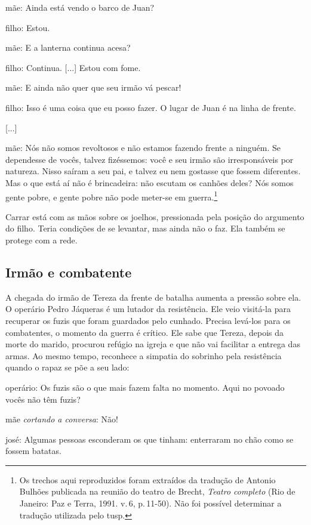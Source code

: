 {\sc mãe}: Ainda está vendo o barco de Juan?

{\sc filho}: Estou.

{\sc mãe}: E a lanterna continua acesa?

{\sc filho}: Continua. {[}...{]} Estou com fome.

{\sc mãe}: E ainda não quer que seu irmão vá pescar!

{\sc filho}: Isso é uma coisa que eu posso fazer. O lugar de Juan é na linha
de frente.

{[}...{]}

{\sc mãe}: Nós não somos revoltosos e não estamos fazendo frente a ninguém.
Se dependesse de vocês, talvez fizéssemos: você e seu irmão são
irresponsáveis por natureza. Nisso saíram a seu pai, e talvez eu nem
gostasse que fossem diferentes. Mas o que está aí não é brincadeira: não
escutam os canhões deles? Nós somos gente pobre, e gente pobre não pode
meter-se em guerra.\footnote{Os trechos aqui reproduzidos foram
  extraídos da tradução de Antonio Bulhões publicada na reunião do
  teatro de Brecht, {\it Teatro completo} (Rio de Janeiro: Paz e Terra,
  1991. v.\,6, p.\,11-50). Não foi possível determinar a tradução
  utilizada pelo {\sc tusp}.}

Carrar está com as mãos sobre os joelhos, pressionada pela posição do
argumento do filho. Teria condições de se levantar, mas ainda não o faz.
Ela também se protege com a rede.

\subsection{Irmão e combatente}

A chegada do irmão de Tereza da frente de batalha aumenta a pressão
sobre ela. O operário Pedro Jáqueras é um lutador da resistência. Ele
veio visitá-la para recuperar os fuzis que foram guardados pelo cunhado.
Precisa levá-los para os combatentes, o momento da guerra é crítico. Ele
sabe que Tereza, depois da morte do marido, procurou refúgio na igreja e
que não vai facilitar a entrega das armas. Ao mesmo tempo, reconhece a
simpatia do sobrinho pela resistência quando o rapaz se põe a seu lado:

{\sc operário}: Os fuzis são o que mais fazem falta no momento. Aqui no
povoado vocês não têm fuzis?

{\sc mãe} {\it cortando a conversa}: Não!

{\sc josé}: Algumas pessoas esconderam os que tinham: enterraram no chão como
se fossem batatas.

